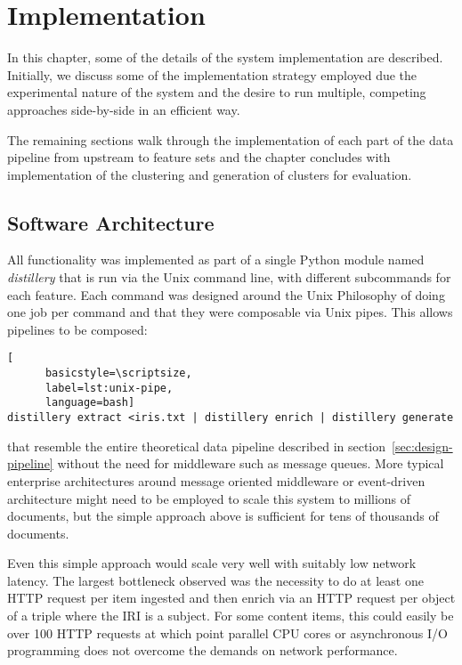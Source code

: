 \chapter{Implementation}
\label{chp:implementation}

In this chapter, some of the details of the system implementation
are described. Initially, we discuss some of the implementation
strategy employed due the experimental nature of the system and the
desire to run multiple, competing approaches side-by-side in an
efficient way.

The remaining sections walk through the implementation of each part
of the data pipeline from upstream to feature sets and the chapter
concludes with implementation of the clustering and generation of
clusters for evaluation.

\section{Software Architecture}

All functionality was implemented as part of a single Python module
named \emph{distillery}
that is run via the Unix command line, with different subcommands for
each feature. Each command was designed around the
Unix Philosophy\cite{raymond2003art} of doing one job per command and
that they were composable via Unix pipes. This allows pipelines to
be composed:

\begin{centering}
  \begin{lstlisting}[
      basicstyle=\scriptsize,
      label=lst:unix-pipe,
      language=bash]
distillery extract <iris.txt | distillery enrich | distillery generate
  \end{lstlisting}
\end{centering}

\noindent that resemble the entire theoretical data pipeline described in
section~\ref{sec:design-pipeline} without the need for middleware
such as message queues. More typical enterprise architectures around
message oriented middleware or event-driven architecture might need
to be employed to scale this system to millions of documents, but
the simple approach above is sufficient for tens of thousands of
documents.

Even this simple approach would scale very well with suitably low
network latency. The largest bottleneck observed was the necessity
to do at least one HTTP request per item ingested and then enrich
via an HTTP request per object of a triple where the IRI is a subject.
For some content items, this could easily be over 100 HTTP requests at
which point parallel CPU cores or asynchronous I/O programming does
not overcome the demands on network performance.

